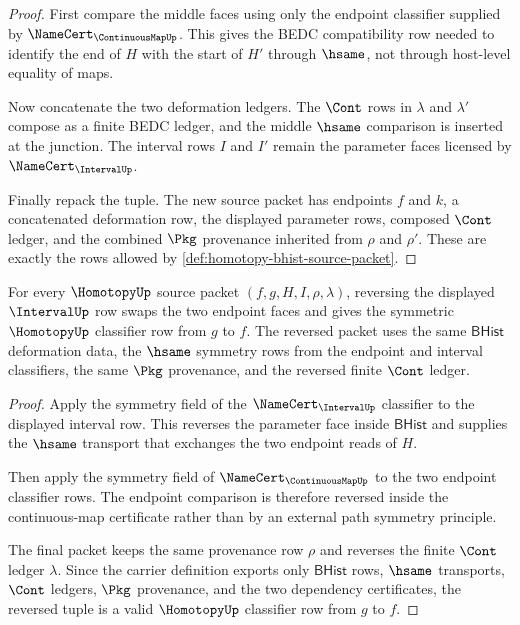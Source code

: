 \begin{proof}
First compare the middle faces using only the endpoint classifier supplied by
$\NameCert_{\ContinuousMapUp}$. This gives the BEDC compatibility row needed
to identify the end of $H$ with the start of $H'$ through $\hsame$, not
through host-level equality of maps.

Now concatenate the two deformation ledgers. The $\Cont$ rows in $\lambda$
and $\lambda'$ compose as a finite BEDC ledger, and the middle $\hsame$
comparison is inserted at the junction. The interval rows $I$ and $I'$ remain
the parameter faces licensed by $\NameCert_{\IntervalUp}$.

Finally repack the tuple. The new source packet has endpoints $f$ and $k$, a
concatenated deformation row, the displayed parameter rows, composed
$\Cont$ ledger, and the combined $\Pkg$ provenance inherited from $\rho$ and
$\rho'$. These are exactly the rows allowed by
\autoref{def:homotopy-bhist-source-packet}.
\end{proof}

\begin{theorem}
\label{thm:homotopy-reversal-symmetry-row}
For every $\HomotopyUp$ source packet $(f,g,H,I,\rho,\lambda)$, reversing the
displayed $\IntervalUp$ row swaps the two endpoint faces and gives the
symmetric $\HomotopyUp$ classifier row from $g$ to $f$. The reversed packet
uses the same $\mathsf{BHist}$ deformation data, the $\hsame$ symmetry rows
from the endpoint and interval classifiers, the same $\Pkg$ provenance, and
the reversed finite $\Cont$ ledger.
\end{theorem}

\begin{proof}
Apply the symmetry field of the $\NameCert_{\IntervalUp}$ classifier to the
displayed interval row. This reverses the parameter face inside
$\mathsf{BHist}$ and supplies the $\hsame$ transport that exchanges the two
endpoint reads of $H$.

Then apply the symmetry field of $\NameCert_{\ContinuousMapUp}$ to the two
endpoint classifier rows. The endpoint comparison is therefore reversed
inside the continuous-map certificate rather than by an external path
symmetry principle.

The final packet keeps the same provenance row $\rho$ and reverses the finite
$\Cont$ ledger $\lambda$. Since the carrier definition exports only
$\mathsf{BHist}$ rows, $\hsame$ transports, $\Cont$ ledgers, $\Pkg$
provenance, and the two dependency certificates, the reversed tuple is a
valid $\HomotopyUp$ classifier row from $g$ to $f$.
\end{proof}

